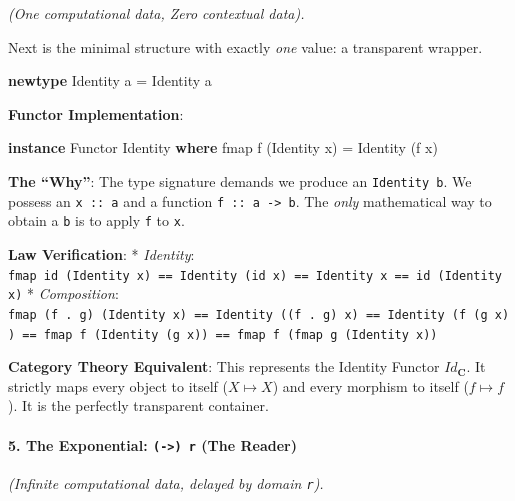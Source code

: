 \documentclass[
]{article}
\newenvironment{Shaded}{}{}
\newcommand{\DataTypeTok}[1]{\textcolor[rgb]{0.56,0.13,0.00}{#1}}
\newcommand{\FunctionTok}[1]{\textcolor[rgb]{0.02,0.16,0.49}{#1}}
\newcommand{\KeywordTok}[1]{\textcolor[rgb]{0.00,0.44,0.13}{\textbf{#1}}}
\newcommand{\NormalTok}[1]{#1}
\newcommand{\OtherTok}[1]{\textcolor[rgb]{0.00,0.44,0.13}{#1}}
\begin{document}
\emph{(One computational data, Zero contextual data).}

Next is the minimal structure with exactly \emph{one} value: a
transparent wrapper.

\begin{Shaded}
\begin{Highlighting}[]
\KeywordTok{newtype} \DataTypeTok{Identity}\NormalTok{ a }\OtherTok{=} \DataTypeTok{Identity}\NormalTok{ a}
\end{Highlighting}
\end{Shaded}

\textbf{Functor Implementation}:

\begin{Shaded}
\begin{Highlighting}[]
\KeywordTok{instance} \DataTypeTok{Functor} \DataTypeTok{Identity} \KeywordTok{where}
    \FunctionTok{fmap}\NormalTok{ f (}\DataTypeTok{Identity}\NormalTok{ x) }\OtherTok{=} \DataTypeTok{Identity}\NormalTok{ (f x)}
\end{Highlighting}
\end{Shaded}

\textbf{The ``Why''}: The type signature demands we produce an
\texttt{Identity\ b}. We possess an \texttt{x\ ::\ a} and a function
\texttt{f\ ::\ a\ -\textgreater{}\ b}. The \emph{only} mathematical way
to obtain a \texttt{b} is to apply \texttt{f} to \texttt{x}.

\textbf{Law Verification}: * \emph{Identity}:
\texttt{fmap\ id\ (Identity\ x)\ ==\ Identity\ (id\ x)\ ==\ Identity\ x\ ==\ id\ (Identity\ x)}
* \emph{Composition}:
\texttt{fmap\ (f\ .\ g)\ (Identity\ x)\ ==\ Identity\ ((f\ .\ g)\ x)\ ==\ Identity\ (f\ (g\ x))\ ==\ fmap\ f\ (Identity\ (g\ x))\ ==\ fmap\ f\ (fmap\ g\ (Identity\ x))}

\textbf{Category Theory Equivalent}: This represents the Identity
Functor \(Id_{\mathbf{C}}\). It strictly maps every object to itself
(\(X \mapsto X\)) and every morphism to itself (\(f \mapsto f\)). It is
the perfectly transparent container.

\paragraph{\texorpdfstring{5. The Exponential:
\texttt{(-\textgreater{})\ r} (The
Reader)}{5. The Exponential: (-\textgreater) r (The Reader)}}\label{the-exponential---r-the-reader}

\emph{(Infinite computational data, delayed by domain \texttt{r}).}
\end{document}
